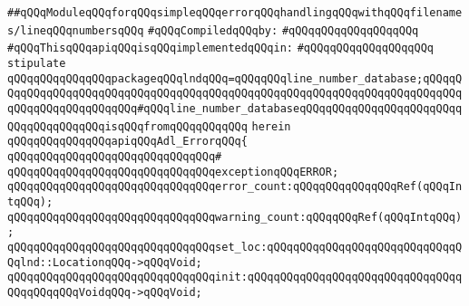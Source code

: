 \label{src/lib/compiler/back/low/tools/line-number-db/adl-error.api}
\verb|##qQQqModuleqQQqforqQQqsimpleqQQqerrorqQQqhandlingqQQqwithqQQqfilenames/lineqQQqnumbersqQQq|\newline
\newline
\verb|#qQQqCompiledqQQqby:|\newline
\verb|#qQQqqQQqqQQqqQQqqQQq|\newline
\newline
\verb|#qQQqThisqQQqapiqQQqisqQQqimplementedqQQqin:|\newline
\verb|#qQQqqQQqqQQqqQQqqQQq|\newline
\newline
\verb|stipulate|\newline
\verb|qQQqqQQqqQQqqQQqpackageqQQqlndqQQq=qQQqqQQqline_number_database;qQQqqQQqqQQqqQQqqQQqqQQqqQQqqQQqqQQqqQQqqQQqqQQqqQQqqQQqqQQqqQQqqQQqqQQqqQQqqQQqqQQqqQQqqQQqqQQq#qQQqline_number_databaseqQQqqQQqqQQqqQQqqQQqqQQqqQQqqQQqqQQqqQQqisqQQqfromqQQqqQQqqQQq|\newline
\verb|herein|\newline
\newline
\verb|qQQqqQQqqQQqqQQqapiqQQqAdl_ErrorqQQq{|\newline
\verb|qQQqqQQqqQQqqQQqqQQqqQQqqQQqqQQq#|\newline
\verb|qQQqqQQqqQQqqQQqqQQqqQQqqQQqqQQqexceptionqQQqERROR;|\newline
\newline
\verb|qQQqqQQqqQQqqQQqqQQqqQQqqQQqqQQqerror_count:qQQqqQQqqQQqqQQqRef(qQQqIntqQQq);|\newline
\verb|qQQqqQQqqQQqqQQqqQQqqQQqqQQqqQQqwarning_count:qQQqqQQqRef(qQQqIntqQQq);|\newline
\newline
\verb|qQQqqQQqqQQqqQQqqQQqqQQqqQQqqQQqset_loc:qQQqqQQqqQQqqQQqqQQqqQQqqQQqqQQqlnd::LocationqQQq->qQQqVoid;|\newline
\verb|qQQqqQQqqQQqqQQqqQQqqQQqqQQqqQQqinit:qQQqqQQqqQQqqQQqqQQqqQQqqQQqqQQqqQQqqQQqqQQqVoidqQQq->qQQqVoid;|\newline
\newline
